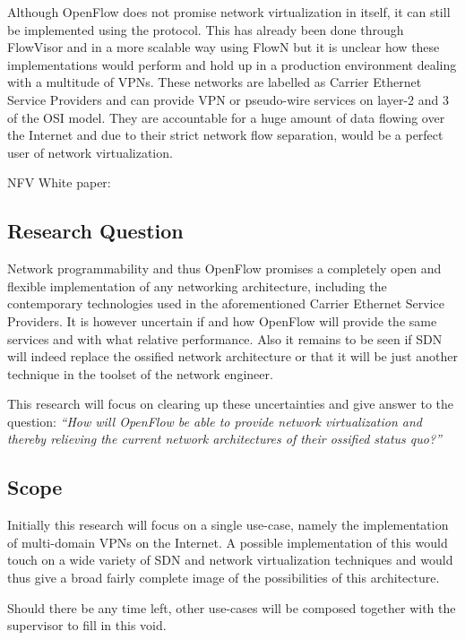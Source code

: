 \documentclass[oneside,twocolumn,7pt,a4paper]{article}
\begin{document}
	Although OpenFlow does not promise network virtualization in itself, it can still be implemented using the protocol. This has already been done through FlowVisor \cite{flowvisor} and in a more scalable way using FlowN \cite{drutskoy2012scalable} but it is unclear how these implementations would perform and hold up in a production environment dealing with a multitude of VPNs. These networks are labelled as Carrier Ethernet Service Providers and can provide VPN or pseudo-wire services on layer-2 and 3 of the OSI model. They are accountable for a huge amount of data flowing over the Internet and due to their strict network flow separation, would be a perfect user of network virtualization.
	
	NFV White paper: \cite{nfv-wp}
			
		\subsection*{Research Question} %
		\label{sub:research_question}
		Network programmability and thus OpenFlow promises a completely open and flexible implementation of any networking architecture, including the contemporary technologies used in the aforementioned Carrier Ethernet Service Providers. It is however uncertain if and how OpenFlow will provide the same services and with what relative performance. Also it remains to be seen if SDN will indeed replace the ossified network architecture or that it will be just another technique in the toolset of the network engineer.
		
		 This research will focus on clearing up these uncertainties and give answer to the question: \textsl{``How will OpenFlow be able to provide network virtualization and thereby relieving the current network architectures of their ossified status quo?''}		

		
		\subsection*{Scope} %
		\label{sub:scope}
		Initially this research will focus on a single use-case, namely the implementation of multi-domain VPNs on the Internet. A possible implementation of this would touch on a wide variety of SDN and network virtualization techniques and would thus give a broad fairly complete image of the possibilities of this architecture.
		
		Should there be any time left, other use-cases will be composed together with the supervisor to fill in this void.
		
\end{document}
